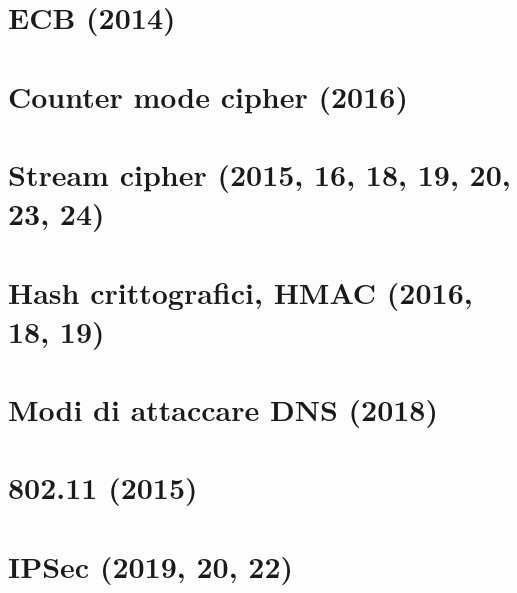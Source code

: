 \documentclass[12pt,oneside,a4paper]{article}
\begin{document}
\section{ECB (2014)}
\section{Counter mode cipher (2016)}
\section{Stream cipher (2015, 16, 18, 19, 20, 23, 24)}
\section{Hash crittografici, HMAC (2016, 18, 19)}
\section{Modi di attaccare DNS (2018)}
\section{802.11 (2015)}
\section{IPSec (2019, 20, 22)}
\end{document}
